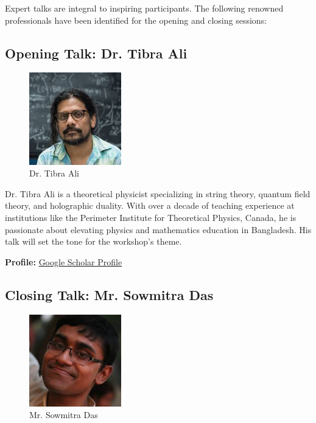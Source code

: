 \documentclass[11pt,a4paper]{article}
\begin{document}
Expert talks are integral to inspiring participants. The following renowned professionals have been identified for the opening and closing sessions:

\subsection{Opening Talk: Dr. Tibra Ali}

\begin{figure}[H]
    \centering
    \includegraphics[width=4cm]{Images/People/Tibra_Ali.png}
    \caption{Dr. Tibra Ali}
\end{figure}

\noindent Dr. Tibra Ali is a theoretical physicist specializing in string theory, quantum field theory, and holographic duality. With over a decade of teaching experience at institutions like the Perimeter Institute for Theoretical Physics, Canada, he is passionate about elevating physics and mathematics education in Bangladesh. His talk will set the tone for the workshop's theme. 

\textbf{Profile:} \href{https://scholar.google.com/citations?user=mnfuAGsAAAAJ&hl=en}{Google Scholar Profile}

\subsection{Closing Talk: Mr. Sowmitra Das}

\begin{figure}[H]
    \centering
    \includegraphics[width=4cm]{Images/People/sowmitra das.png}
    \caption{Mr. Sowmitra Das}
\end{figure}
\end{document}
